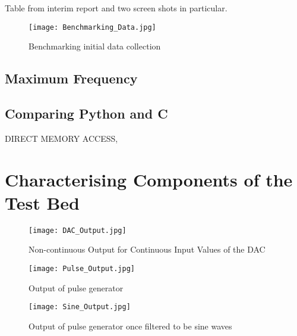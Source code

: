 \documentclass[../main.tex]{subfiles}
\begin{document}
Table from interim report and two screen shots in particular.\\

\begin{figure}[ht]
	\centering
	\texttt{[image: Benchmarking\_Data.jpg]}
	\caption{Benchmarking initial data collection}
\end{figure}

\subsection{Maximum Frequency}


\subsection{Comparing Python and C} \label{sec_Comparing Python and C}

DIRECT MEMORY ACCESS, 

\clearpage


\section{Characterising Components of the Test Bed} \label{sec_Components}

\begin{figure}[ht]
	\centering
	\texttt{[image: DAC\_Output.jpg]}
	\caption{Non-continuous Output for Continuous Input Values of the DAC}
\end{figure}

\begin{figure}[ht]
	\centering
	\texttt{[image: Pulse\_Output.jpg]}
	\caption{Output of pulse generator}
\end{figure}

\begin{figure}[ht]
	\centering
	\texttt{[image: Sine\_Output.jpg]}
	\caption{Output of pulse generator once filtered to be sine waves}
\end{figure}
\end{document}

